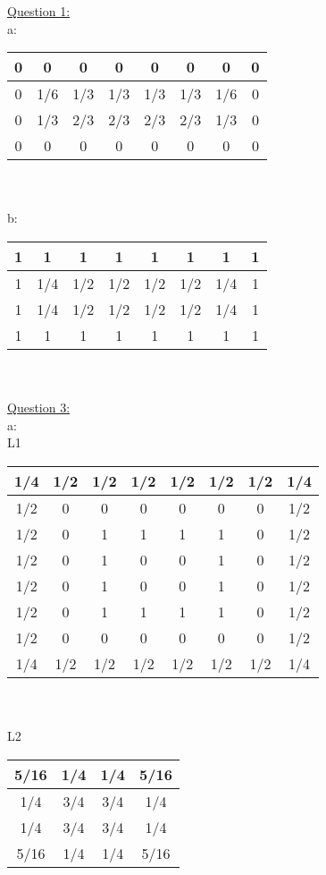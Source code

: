 \documentclass[12pt]{article}\usepackage{amsmath}
\begin{document}
\author{Joel Anna<annajoel@pdx.edu>}
\noindent
\underline{Question 1:}\\
a:
\begin{tabular}{|c|c|c|c|c|c|c|c|}
\hline 
0 & 0 & 0 & 0 & 0 & 0 & 0 & 0  \\
\hline 
0 & 1/6 & 1/3 & 1/3 & 1/3 & 1/3 & 1/6 & 0 \\
\hline 
0 & 1/3 & 2/3 & 2/3 & 2/3 & 2/3 & 1/3 & 0 \\
\hline 
0 & 0 & 0 & 0 & 0 & 0 & 0 & 0 \\
\hline

\end{tabular}\\
\vspace{10pt} \\
b:
\begin{tabular}{|c|c|c|c|c|c|c|c|}
\hline 
1 & 1 & 1 & 1 & 1 & 1 & 1 & 1  \\
\hline 
1 & 1/4 & 1/2 & 1/2 & 1/2 & 1/2 & 1/4 & 1 \\
\hline 
1 & 1/4 & 1/2 & 1/2 & 1/2 & 1/2 & 1/4 & 1 \\
\hline 
1 & 1 & 1 & 1 & 1 & 1 & 1 & 1  \\
\hline
\end{tabular}\\
\vspace{10pt} \\
\underline{Question 3:}\\
a:\\ L1
\begin{tabular}{|c|c|c|c|c|c|c|c|}
\hline
1/4 & 1/2 & 1/2 & 1/2 & 1/2 & 1/2 & 1/2 & 1/4
\\
\hline
1/2 & 0 & 0 & 0 & 0 & 0 & 0 & 1/2\\
\hline
1/2 & 0 & 1 & 1 & 1 & 1 & 0 & 1/2\\
\hline
1/2 & 0 & 1 & 0 & 0 & 1 & 0 & 1/2\\
\hline
1/2 & 0 & 1 & 0 & 0 & 1 & 0 & 1/2\\
\hline
1/2 & 0 & 1 & 1 & 1 & 1 & 0 & 1/2\\
\hline
1/2 & 0 & 0 & 0 & 0 & 0 & 0 & 1/2\\
\hline
1/4 & 1/2 & 1/2 & 1/2 & 1/2 & 1/2 & 1/2 & 1/4
\\
\hline
\end{tabular}\\
\vspace{10pt} \\
L2
\begin{tabular}[]{|c|c|c|c|}
\hline
5/16 & 1/4 & 1/4 & 5/16\\
\hline
1/4 & 3/4 & 3/4 & 1/4 \\
\hline
1/4 & 3/4 & 3/4 & 1/4 \\
\hline
5/16 & 1/4 & 1/4 & 5/16
\\
\hline
\end{tabular}
\end{document}
